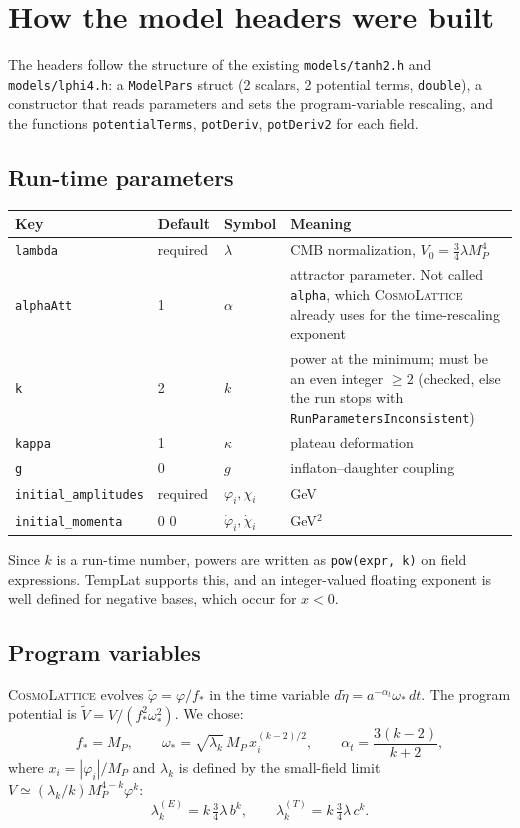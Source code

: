 \documentclass[11pt,a4paper]{article}
\newcommand{\MP}{M_P}
\newcommand{\aatt}{\alpha}
\newcommand{\at}{\alpha_t}
\newcommand{\file}[1]{\texttt{#1}}
\begin{document}
\section{How the model headers were built}
\label{sec:headers}
The headers follow the structure of the existing \file{models/tanh2.h} and \file{models/lphi4.h}: a \texttt{ModelPars} struct (2 scalars, 2 potential terms, \texttt{double}), a constructor that reads parameters and sets the program-variable rescaling, and the functions \texttt{potentialTerms}, \texttt{potDeriv}, \texttt{potDeriv2} for each field.

\subsection{Run-time parameters}
\begin{center}
\begin{tabular}{@{}l l l p{}@{}}
\toprule
Key & Default & Symbol & Meaning \\
\midrule
\texttt{lambda}   & required & $\lambda$ & CMB normalization, $V_0=\frac34\lambda\MP^4$ \\
\texttt{alphaAtt} & 1  & $\aatt$ & attractor parameter. Not called \texttt{alpha}, which \textsc{CosmoLattice} already uses for the time-rescaling exponent \\
\texttt{k}        & 2  & $k$ & power at the minimum; must be an even integer $\ge2$ (checked, else the run stops with \texttt{RunParametersInconsistent}) \\
\texttt{kappa}    & 1  & $\kappa$ & plateau deformation \\
\texttt{g}        & 0  & $g$ & inflaton--daughter coupling \\
\texttt{initial\_amplitudes} & required & $\varphi_i,\chi_i$ & GeV \\
\texttt{initial\_momenta} & 0 0 & $\dot\varphi_i,\dot\chi_i$ & GeV$^2$ \\
\bottomrule
\end{tabular}
\end{center}
Since $k$ is a run-time number, powers are written as \texttt{pow(expr, k)} on field expressions. TempLat supports this, and an integer-valued floating exponent is well defined for negative bases, which occur for $x<0$.

\subsection{Program variables}
\textsc{CosmoLattice} evolves $\tilde\varphi=\varphi/f_*$ in the time variable $d\tilde\eta=a^{-\at}\omega_*\,dt$. The program potential is $\tilde V=V/(f_*^2\omega_*^2)$. We chose:
\begin{equation}
f_*=\MP,\qquad
\omega_*=\sqrt{\lambda_k}\,\MP\,x_i^{(k-2)/2},\qquad
\at=\frac{3(k-2)}{k+2},
\end{equation}
where $x_i=|\varphi_i|/\MP$ and $\lambda_k$ is defined by the small-field limit $V\simeq(\lambda_k/k)\MP^{4-k}\varphi^k$:
\begin{equation}
\lambda_k^{(E)}=k\,\tfrac34\lambda\,b^k,\qquad \lambda_k^{(T)}=k\,\tfrac34\lambda\,c^k .
\end{equation}
\end{document}

